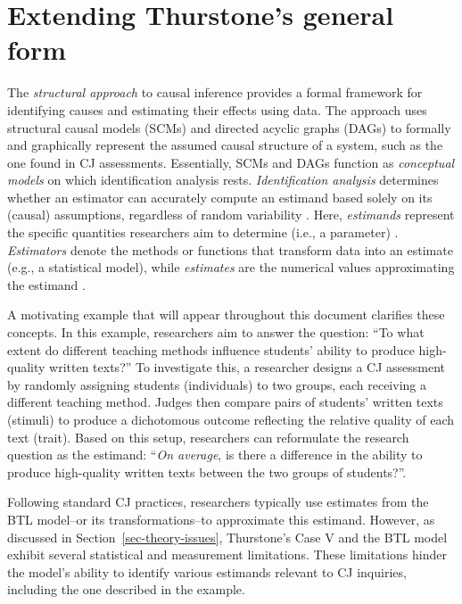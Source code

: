 \documentclass[
  authoryear,
  review,
  1p]{elsarticle}
\begin{document}
\section{Extending Thurstone's general form}\label{sec-theoretical}

The \emph{structural approach} to causal inference provides a formal
framework for identifying causes and estimating their effects using
data. The approach uses structural causal models (SCMs) and directed
acyclic graphs (DAGs)
\citep{Pearl_2009, Pearl_et_al_2016, Gross_et_al_2018, Neal_2020} to
formally and graphically represent the assumed causal structure of a
system, such as the one found in CJ assessments. Essentially, SCMs and
DAGs function as \emph{conceptual models} on which identification
analysis rests. \emph{Identification analysis} determines whether an
estimator can accurately compute an estimand based solely on its
(causal) assumptions, regardless of random variability
\citep{Schuessler_et_al_2023}. Here, \emph{estimands} represent the
specific quantities researchers aim to determine (i.e., a parameter)
\citep{Everitt_et_al_2010}. \emph{Estimators} denote the methods or
functions that transform data into an estimate (e.g., a statistical
model), while \emph{estimates} are the numerical values approximating
the estimand \citep{Neal_2020, Everitt_et_al_2010}.

A motivating example that will appear throughout this document clarifies
these concepts. In this example, researchers aim to answer the question:
``To what extent do different teaching methods influence students'
ability to produce high-quality written texts?'' To investigate this, a
researcher designs a CJ assessment by randomly assigning students
(individuals) to two groups, each receiving a different teaching method.
Judges then compare pairs of students' written texts (stimuli) to
produce a dichotomous outcome reflecting the relative quality of each
text (trait). Based on this setup, researchers can reformulate the
research question as the estimand: ``\emph{On average}, is there a
difference in the ability to produce high-quality written texts between
the two groups of students?''.

Following standard CJ practices, researchers typically use estimates
from the BTL model--or its transformations--to approximate this
estimand. However, as discussed in Section~\ref{sec-theory-issues},
Thurstone's Case V and the BTL model exhibit several statistical and
measurement limitations. These limitations hinder the model's ability to
identify various estimands relevant to CJ inquiries, including the one
described in the example.
\end{document}
